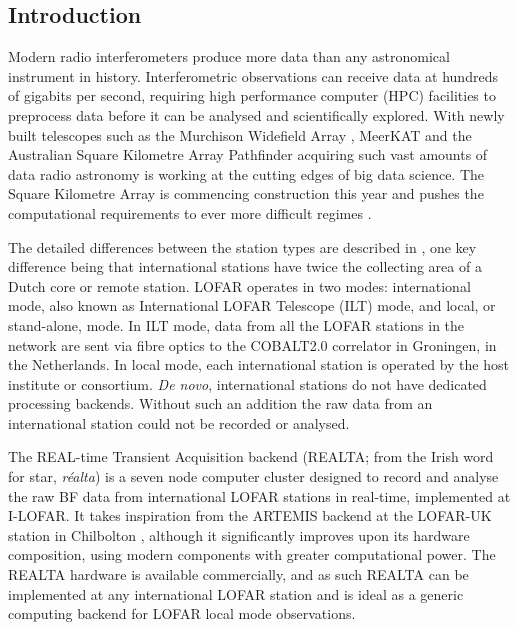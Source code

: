 \subsection{Introduction}
\label{sec:realta_intro}
Modern radio interferometers produce more data than any astronomical instrument in history. Interferometric observations can receive data at hundreds of gigabits per second, requiring high performance computer (HPC) facilities to preprocess data before it can be analysed and scientifically explored. With newly built telescopes such as the Murchison Widefield Array \citep[MWA;][]{Lonsdale2009}, MeerKAT \citep{Jonas2016} and the Australian Square Kilometre Array Pathfinder \citep[ASKAP;][]{Johnston2008} acquiring such vast amounts of data \citep[up to $300$~Gbps;][]{Voronkov2020, Lonsdale2009} radio astronomy is working at the cutting edges of big data science. The Square Kilometre Array \citep{McMullin2020} is commencing construction this year and pushes the computational requirements to ever more difficult regimes \citep{Scaife2020}.

 The detailed differences between the station types are described in \cite{VanHaarlem2013}, one key difference being that international stations have twice the collecting area of a Dutch core or remote station. LOFAR operates in two modes: international mode, also known as International LOFAR Telescope (ILT) mode, and local, or stand-alone, mode. In ILT mode, data from all the LOFAR stations in the network are sent via fibre optics to the COBALT2.0 correlator \citep[an upgrade to COBALT1.0,][]{Broekema2018} in Groningen, in the Netherlands. In local mode, each international station is operated by the host institute or consortium. \textit{De novo}, international stations do not have dedicated processing backends. Without such an addition the raw data from an international station could not be recorded or analysed. 



The REAL-time Transient Acquisition backend (REALTA; from the Irish word for star, \textit{r\'ealta}) is a seven node computer cluster designed to record and analyse the raw BF data from international LOFAR stations in real-time, implemented at I-LOFAR. It takes inspiration from the ARTEMIS backend at the LOFAR-UK station in Chilbolton \citep{Serylak2012,Karastergiou2015}, although it significantly improves upon its hardware composition, using modern components with greater computational power. The REALTA hardware is available commercially, and as such REALTA can be implemented at any international LOFAR station and is ideal as a generic computing backend for LOFAR local mode observations.

